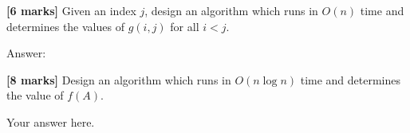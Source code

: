 \documentclass{article}
\begin{document}
\begin{Question}
\begin{Subquestion}\label{count-max}
\textbf{[6 marks]} Given an index $j$, design an algorithm which runs in $O(n)$ time and determines the values of $g(i,j)$ for all $i < j$.

\begin{answer}
Answer:
\begin{quote}
    
\end{quote}
\end{answer}
\end{Subquestion}

\begin{Subquestion}
\textbf{[8 marks]} Design an algorithm which runs in $O(n \log n)$ time and determines the value of $f(A)$.

\begin{answer}
Your answer here.
\end{answer}
\end{Subquestion}
\end{Question}
\end{document}
